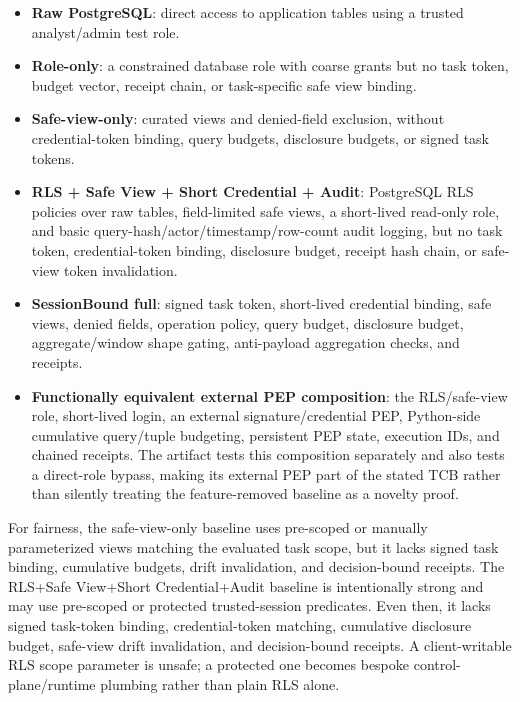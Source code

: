 \documentclass[journal]{IEEEtran}
\providecommand{\tightlist}{%
  \setlength{\itemsep}{0pt}\setlength{\parskip}{0pt}}
\begin{document}
\begin{itemize}
\tightlist
\item
  \textbf{Raw PostgreSQL}: direct access to application tables using a
  trusted analyst/admin test role.
\item
  \textbf{Role-only}: a constrained database role with coarse grants but
  no task token, budget vector, receipt chain, or task-specific safe
  view binding.
\item
  \textbf{Safe-view-only}: curated views and denied-field exclusion,
  without credential-token binding, query budgets, disclosure budgets,
  or signed task tokens.
\item
  \textbf{RLS + Safe View + Short Credential + Audit}: PostgreSQL RLS
  policies over raw tables, field-limited safe views, a short-lived
  read-only role, and basic query-hash/actor/timestamp/row-count audit
  logging, but no task token, credential-token binding, disclosure
  budget, receipt hash chain, or safe-view token invalidation.
\item
  \textbf{SessionBound full}: signed task token, short-lived credential
  binding, safe views, denied fields, operation policy, query budget,
  disclosure budget, aggregate/window shape gating, anti-payload
  aggregation checks, and receipts.
\item
  \textbf{Functionally equivalent external PEP composition}: the RLS/safe-view
  role, short-lived login, an external signature/credential PEP, Python-side
  cumulative query/tuple budgeting, persistent PEP state, execution IDs, and
  chained receipts. The artifact tests this composition separately and also
  tests a direct-role bypass, making its external PEP part of the stated TCB
  rather than silently treating the feature-removed baseline as a novelty proof.
\end{itemize}

For fairness, the safe-view-only baseline uses pre-scoped or manually
parameterized views matching the evaluated task scope, but it lacks
signed task binding, cumulative budgets, drift invalidation, and
decision-bound receipts. The RLS+Safe View+Short Credential+Audit
baseline is intentionally strong and may use pre-scoped or protected
trusted-session predicates. Even then, it lacks signed task-token
binding, credential-token matching, cumulative disclosure budget,
safe-view drift invalidation, and decision-bound receipts. A
client-writable RLS scope parameter is unsafe; a protected one becomes
bespoke control-plane/runtime plumbing rather than plain RLS alone.
\end{document}
